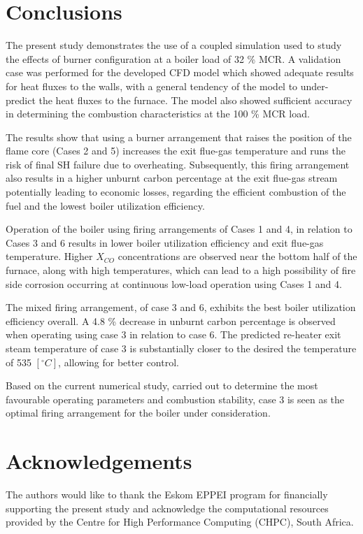 \documentclass[review]{elsarticle}
\begin{document}
\clearpage
\section{Conclusions}
The present study demonstrates the use of a coupled simulation used to study the effects of burner configuration at a boiler load of 32 \% MCR. A validation case was performed for the developed CFD model which showed adequate results for heat fluxes to the walls, with a general tendency of the model to under-predict the heat fluxes to the furnace. The model also showed sufficient accuracy in determining the combustion characteristics at the 100 \% MCR load. 

The results show that using a burner arrangement that raises the position of the flame core (Cases 2 and 5) increases the exit flue-gas temperature and runs the risk of final SH failure due to overheating. Subsequently, this firing arrangement also results in a higher unburnt carbon percentage at the exit flue-gas stream potentially leading to economic losses, regarding the efficient combustion of the fuel and the lowest boiler utilization efficiency.

Operation of the boiler using firing arrangements of Cases 1 and 4, in relation to Cases 3 and 6 results in lower boiler utilization efficiency and exit flue-gas temperature. Higher $X_{CO}$ concentrations are observed near the bottom half of the furnace, along with high temperatures, which can lead to a high possibility of fire side corrosion occurring at continuous low-load operation using Cases 1 and 4.

The mixed firing arrangement, of case 3 and 6, exhibits the best boiler utilization efficiency overall. A 4.8 \% decrease in unburnt carbon percentage is observed when operating using case 3 in relation to case 6. The predicted re-heater exit steam temperature of case 3 is substantially closer to the desired the temperature of 535 $[^\circ C]$, allowing for better control. 

Based on the current numerical study, carried out to determine the most favourable operating parameters and combustion stability, case 3 is seen as the optimal firing arrangement for the boiler under consideration.

\section*{Acknowledgements}
The authors would like to thank the Eskom EPPEI program for financially supporting the present study and acknowledge the computational resources provided by the Centre for High Performance Computing (CHPC), South Africa.


\end{document}
